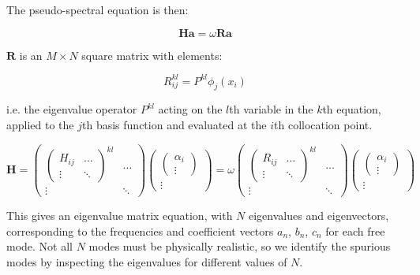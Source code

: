 The pseudo-spectral equation is then:

\begin{equation}
  \textbf{H} \textbf{a} = \omega \textbf{R} \textbf{a}
\end{equation}

 $\textbf{R}$ is an $M \times N$ square matrix with elements:

\begin{equation}
  R^{kl}_{ij} = P^{kl}\phi_{j}(x_{i})
\end{equation}

i.e. the eigenvalue operator $P^{kl}$ acting on the $l$th variable in the $k$th equation, applied to the $j$th basis function and evaluated at the $i$th collocation point.

\begin{equation}
    \textbf{H} =
  \begin{pmatrix}
    \begin{pmatrix}
H_{ij} & \dots \\
\vdots & \ddots
    \end{pmatrix}^{kl} & \dots \\
  \vdots & \ddots
  \end{pmatrix}
  \begin{pmatrix}
    \begin{pmatrix}
    \alpha_{i} \\
    \vdots
    \end{pmatrix} \\
  \vdots
  \end{pmatrix}
  =
  \omega
  \begin{pmatrix}
    \begin{pmatrix}
R_{ij} & \dots \\
\vdots & \ddots
    \end{pmatrix}^{kl} & \dots \\
  \vdots & \ddots
  \end{pmatrix}
  \begin{pmatrix}
    \begin{pmatrix}
    \alpha_{i} \\
    \vdots
    \end{pmatrix} \\
  \vdots
  \end{pmatrix}
\end{equation}


This gives an eigenvalue matrix equation, with $N$ eigenvalues and eigenvectors, corresponding to the frequencies and coefficient vectors $a_{n}$, $b_{n}$, $c_{n}$ for each free mode. Not all $N$ modes must be physically realistic, so we identify the spurious modes by inspecting the eigenvalues for different values of $N$.


